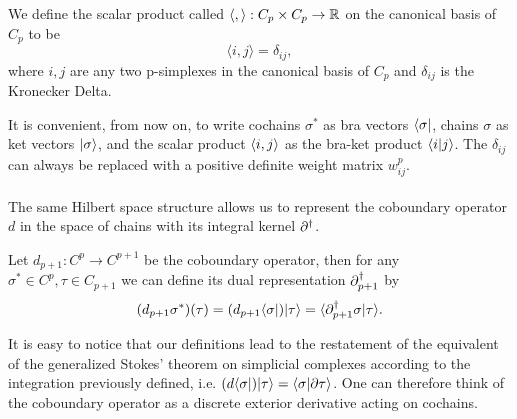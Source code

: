\documentclass[../1.tex]{subfiles}
\begin{document}
    \begin{defn}
        We define the scalar product called  $\langle, \rangle : C_p \times C_p \to \mathbb{R}$ on the canonical basis of $C_p$ to be 
        \[ \langle i, j \rangle = \delta_{ij} ,\]  
        where $i,j$ are any two p-simplexes in the canonical basis of $C_p$ and $\delta_{ij}$ is the Kronecker Delta.
    \end{defn}

    It is convenient, from now on,  to write cochains $\sigma^*$ as bra vectors $\langle \sigma |$, chains $\sigma$ as ket vectors $| \sigma \rangle$,
    and the scalar product $\langle i, j \rangle$ as the bra-ket product $\langle i | j \rangle$. The $\delta_{ij}$ can always be replaced with a positive definite
    weight matrix $w^p_{ij}$.\\
    \hfill \\
    The same Hilbert space structure allows us to represent the coboundary operator $d$ in the space of chains with its integral kernel $\partial^\dagger$.

    \begin{defn}
        Let $d_{p+1} : C^p \to C^{p+1}$ be the coboundary operator, then for any $\sigma^* \in C^p, \tau \in C_{p+1}$ we can define its dual representation $\partial^\dagger_{p+1}$ by
        \[ (d_{p+1} \sigma^*)(\tau) = (d_{p+1} \langle \sigma |)| \tau \rangle = \langle \partial^\dagger_{p+1} \sigma | \tau \rangle. \]
    \end{defn}

    It is easy to notice that our definitions lead to the restatement of the equivalent of the generalized Stokes' theorem on simplicial complexes
    according to the integration previously defined, i.e. $(d\langle \sigma |)| \tau \rangle = \langle \sigma | \partial\tau \rangle$. One can therefore think of the coboundary
    operator as a discrete exterior derivative acting on cochains.
   
\end{document}
